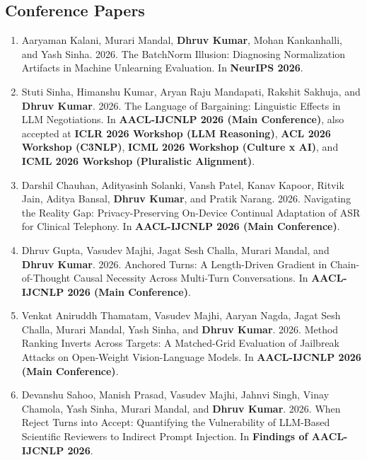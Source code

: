 \documentclass[10pt, a4paper]{article}
\begin{document}
\subsection*{Conference Papers}
\begin{enumerate}[label=\textbf{C\arabic*.}, leftmargin=2.8em, itemsep=0.3em]

\item Aaryaman Kalani, Murari Mandal, \textbf{Dhruv Kumar}, Mohan Kankanhalli, and Yash Sinha. 2026. The BatchNorm Illusion: Diagnosing Normalization Artifacts in Machine Unlearning Evaluation. In \textbf{NeurIPS 2026}.

\item Stuti Sinha, Himanshu Kumar, Aryan Raju Mandapati, Rakshit Sakhuja, and \textbf{Dhruv Kumar}. 2026. The Language of Bargaining: Linguistic Effects in LLM Negotiations. In \textbf{AACL-IJCNLP 2026 (Main Conference)}, also accepted at \textbf{ICLR 2026 Workshop (LLM Reasoning)}, \textbf{ACL 2026 Workshop (C3NLP)}, \textbf{ICML 2026 Workshop (Culture x AI)}, and \textbf{ICML 2026 Workshop (Pluralistic Alignment)}.

\item Darshil Chauhan, Adityasinh Solanki, Vansh Patel, Kanav Kapoor, Ritvik Jain, Aditya Bansal, \textbf{Dhruv Kumar}, and Pratik Narang. 2026. Navigating the Reality Gap: Privacy-Preserving On-Device Continual Adaptation of ASR for Clinical Telephony. In \textbf{AACL-IJCNLP 2026 (Main Conference)}.

\item Dhruv Gupta, Vasudev Majhi, Jagat Sesh Challa, Murari Mandal, and \textbf{Dhruv Kumar}. 2026. Anchored Turns: A Length-Driven Gradient in Chain-of-Thought Causal Necessity Across Multi-Turn Conversations. In \textbf{AACL-IJCNLP 2026 (Main Conference)}.

\item Venkat Aniruddh Thamatam, Vasudev Majhi, Aaryan Nagda, Jagat Sesh Challa, Murari Mandal, Yash Sinha, and \textbf{Dhruv Kumar}. 2026. Method Ranking Inverts Across Targets: A Matched-Grid Evaluation of Jailbreak Attacks on Open-Weight Vision-Language Models. In \textbf{AACL-IJCNLP 2026 (Main Conference)}.

\item Devanshu Sahoo, Manish Prasad, Vasudev Majhi, Jahnvi Singh, Vinay Chamola, Yash Sinha, Murari Mandal, and \textbf{Dhruv Kumar}. 2026. When Reject Turns into Accept: Quantifying the Vulnerability of LLM-Based Scientific Reviewers to Indirect Prompt Injection. In \textbf{Findings of AACL-IJCNLP 2026}.


\end{enumerate}
\end{document}
